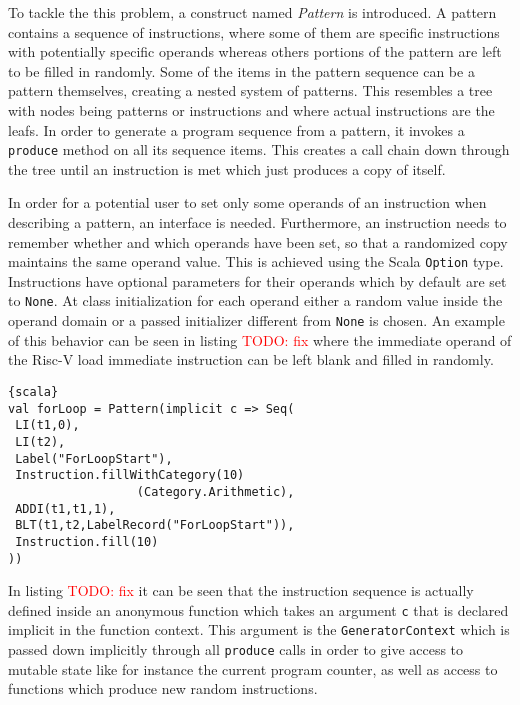 \documentclass[conference]{IEEEtran}
\newcommand{\todo}[1]{\textcolor{red}{TODO: #1}}
\begin{document}
To tackle the this problem, a construct named \textit{Pattern} is introduced. A pattern contains 
a sequence of instructions, where some of them are specific instructions with potentially specific 
operands whereas others portions of the pattern are left to be filled in randomly. Some of the 
items in the pattern sequence can be a pattern themselves, creating a nested system of patterns. 
This resembles a tree with nodes being patterns or instructions and where actual instructions are 
the leafs. In order to generate a program sequence from a pattern, it invokes a \texttt{produce} 
method on all its sequence items. This creates a call chain down through the tree until an instruction 
is met which just produces a copy of itself.


In order for a potential user to set only some operands of an instruction when describing a pattern, 
an interface is needed. Furthermore, an instruction needs to remember whether and which operands 
have been set, so that a randomized copy maintains the same operand value. This is achieved using 
the Scala \texttt{Option} type. Instructions have optional parameters for their operands which by 
default are set to \texttt{None}. At class initialization for each operand either a random value 
inside the operand domain or a passed initializer different from \texttt{None} is chosen. An example 
of this behavior can be seen in listing \todo{fix} where the immediate operand of the Risc-V 
load immediate instruction can be left blank and filled in randomly.


\begin{lstlisting}{scala}
val forLoop = Pattern(implicit c => Seq(
 LI(t1,0),
 LI(t2),
 Label("ForLoopStart"),
 Instruction.fillWithCategory(10)
                  (Category.Arithmetic),
 ADDI(t1,t1,1),
 BLT(t1,t2,LabelRecord("ForLoopStart")),
 Instruction.fill(10)
))
\end{lstlisting}


In listing \todo{fix} it can be seen that the instruction sequence is actually defined 
inside an anonymous function which takes an argument \texttt{c} that is declared implicit in the 
function context. This argument is the \texttt{GeneratorContext} which is passed down implicitly 
through all \texttt{produce} calls in order to give access to mutable state like for instance the 
current program counter, as well as access to functions which produce new random instructions.


\end{document}
